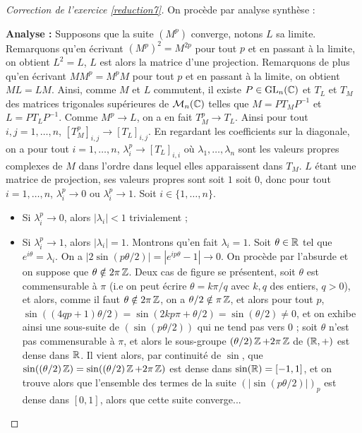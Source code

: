 \begin{proof}[Correction de l'exercice \ref{reduction7}]
    On procède par analyse synthèse :

    \textbf{Analyse :} Supposons que la suite $(M^p)$ converge, notons $L$ sa limite.
    Remarquons qu'en écrivant $(M^p)^2=M^{2p}$ pour tout $p$ et en passant à la limite, on obtient $L^2=L$,
    $L$ est alors la matrice d'une projection. Remarquons de plus qu'en écrivant $MM^p=M^pM$ pour tout $p$ et en passant à la limite, on obtient $ML=LM$.
    Ainsi, comme $M$ et $L$ commutent, il existe $P\in\operatorname{GL}_n(\operatorname{\mathbb C})$ et $T_L$ et $T_M$ des matrices trigonales supérieures de $\mathcal M_n(\operatorname{\mathbb C})$ telles que 
    $M=PT_MP^{-1}$ et $L=PT_LP^{-1}$. 
    Comme $M^p\to L$, on a en fait $T_M^p\to T_L$. 
    Ainsi pour tout $i,j=1,\dots,n$, $[T_M^p]_{i,j}\to [T_L]_{i,j}$.
    En regardant les coefficients sur la diagonale, on a pour tout $i=1,\dots,n$, $\lambda_i^p\to [T_L]_{i,i}$
    où $\lambda_1,\dots,\lambda_n$ sont les valeurs propres complexes de $M$ dans l'ordre dans lequel elles apparaissent dans $T_M$.
    $L$ étant une matrice de projection, ses valeurs propres sont soit $1$ soit $0$, donc pour tout $i=1,\dots,n$,
    $\lambda_i^p\to 0$ ou $\lambda_i^p\to 1$.
    Soit $i\in\lbrace1,\dots,n\rbrace$.
    \begin{itemize}
        \item Si $\lambda_i^p\to 0$, alors $|\lambda_i|<1$ trivialement ;
        \item Si $\lambda_i^p\to 1$, alors $|\lambda_i|=1$. 
        Montrons qu'en fait $\lambda_i=1$. 
        Soit $\theta\in\operatorname{\mathbb R}$ tel que $e^{i\theta}=\lambda_i$.
        On a $|2\sin(p\theta/2)|=|e^{ip\theta}-1|\to 0$. 
        On procède par l'absurde et on suppose que $\theta \notin 2\pi\operatorname{\mathbb Z}$.
        Deux cas de figure se présentent, soit $\theta$ est commensurable à $\pi$ 
        (i.e on peut écrire $\theta=k\pi/q$ avec $k,q$ des entiers, $q>0$),
        et alors, comme il faut $\theta\notin2\pi\operatorname{\mathbb Z}$, on a $\theta/2\notin\pi\operatorname{\mathbb Z}$, 
        et alors pour tout $p$, 
        $\sin((4qp+1)\theta/2)=\sin(2kp\pi+\theta/2)=\sin(\theta/2)\neq 0$,
        et on exhibe ainsi une sous-suite de $(\sin(p\theta/2))$ qui ne tend pas vers $0$ ;
        soit $\theta$ n'est pas commensurable à $\pi$, et alors le sous-groupe $(\theta/2)\operatorname{\mathbb Z}+2\pi\operatorname{\mathbb Z}$ de $(\operatorname{\mathbb R},+)$ est dense dans $\operatorname{\mathbb R}$.
        Il vient alors, par continuité de $\sin$, que $\sin((\theta/2)\operatorname{\mathbb Z})=\sin((\theta/2)\operatorname{\mathbb Z}+2\pi\operatorname{\mathbb Z})$ est dense dans $\sin(\operatorname{\mathbb R})=[-1,1]$, et on trouve alors 
        que l'ensemble des termes de la suite $(|\sin(p\theta/2)|)_p$ est dense dans $[0,1]$, alors que cette suite converge... 


\end{itemize}
\end{proof}
